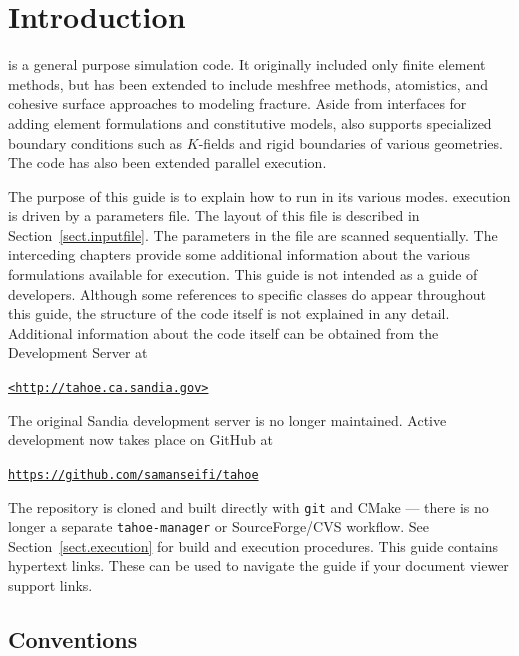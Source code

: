 
\section{Introduction}
\tahoe is a general purpose simulation code.  It originally included only
finite element methods, but has been extended to include meshfree methods,
atomistics, and cohesive surface approaches to modeling fracture.  Aside
from interfaces for adding element formulations and constitutive models,
\tahoe also supports specialized boundary conditions such as $K$-fields and
rigid boundaries of various geometries.  The code has also been extended
parallel execution.

The purpose of this guide is to explain how to run \tahoe in its various
modes.  \tahoe execution is driven by a parameters file.  The layout of this
file is described in Section~\ref{sect.inputfile}.  
The parameters in the file are scanned
sequentially.  The interceding chapters provide some additional information
about the various formulations available for execution.  This guide is not
intended as a guide of developers.  Although some references to specific
classes do appear throughout this guide, the structure of the code itself
is not explained in any detail.  Additional information about the code
itself can be obtained from the \tahoe Development Server at
\begin{center}
\href{http://tahoe.ca.sandia.gov}{\texttt{\textless http://tahoe.ca.sandia.gov\textgreater}}
\end{center}
The original Sandia development server is no longer maintained.
Active development now takes place on GitHub at
\begin{center}
\href{https://github.com/samanseifi/tahoe}{\texttt{https://github.com/samanseifi/tahoe}}
\end{center}
The repository is cloned and built directly with \texttt{git} and
CMake --- there is no longer a separate \texttt{tahoe-manager} or
SourceForge/CVS workflow.  See Section~\ref{sect.execution} for build
and execution procedures.
This guide contains hypertext links.  These can be used to navigate the
guide if your document viewer support links.

\subsection{Conventions}

